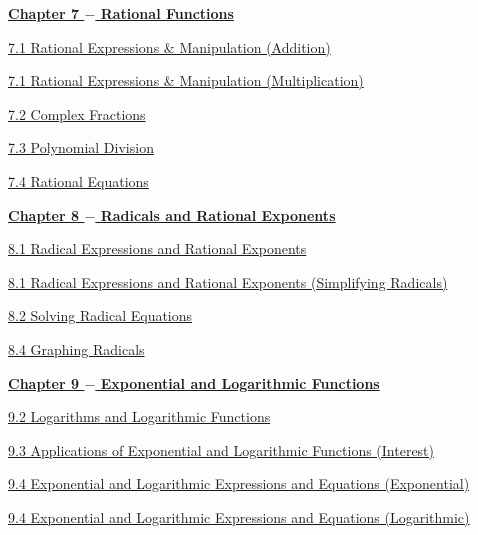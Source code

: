 \documentclass[../book.tex]{subfiles}
\begin{document}
\noindent \underline{\textbf{Chapter 7 $-$ Rational Functions}}

\href{https://cdn.kutasoftware.com/Worksheets/Alg1/Adding%20and%20Subtracting%20Rational%20Expressions.pdf}{7.1   Rational Expressions \& Manipulation (Addition)}

\href{https://cdn.kutasoftware.com/Worksheets/Alg1/Multiplying%20Rational%20Expressions.pdf}{7.1   Rational Expressions \& Manipulation (Multiplication)}

\href{https://cdn.kutasoftware.com/Worksheets/Alg2/Complex%20Fractions.pdf}{7.2   Complex Fractions}

\href{https://cdn.kutasoftware.com/Worksheets/Alg1/Dividing%20Polynomials.pdf}{7.3   Polynomial Division}

\href{https://cdn.kutasoftware.com/Worksheets/Alg1/Solving%20Rational%20Equations%202.pdf}{7.4   Rational Equations} 

\noindent \underline{\textbf{Chapter 8 $-$ Radicals and Rational Exponents}}

\href{https://cdn.kutasoftware.com/Worksheets/Alg2/Radicals%20and%20Rational%20Exponents.pdf}{8.1   Radical Expressions and Rational Exponents}

\href{https://cdn.kutasoftware.com/Worksheets/Alg2/Simplifying%20Radicals.pdf}{8.1   Radical Expressions and Rational Exponents (Simplifying Radicals)}

\href{https://cdn.kutasoftware.com/Worksheets/Alg2/Square%20Root%20Equations.pdf}{8.2   Solving Radical Equations}

\href{https://cdn.kutasoftware.com/Worksheets/Alg2/Graphing%20Radicals.pdf}{8.4   Graphing Radicals}

\noindent \underline{\textbf{Chapter 9 $-$ Exponential and Logarithmic Functions}}

\href{https://cdn.kutasoftware.com/Worksheets/Precalc/03%20-%20Properties%20of%20Logarithms.pdf}{9.2   Logarithms and Logarithmic Functions}

\href{https://cdn.kutasoftware.com/Worksheets/Precalc/03%20-%20Compound%20Interest.pdf}{9.3   Applications of Exponential and Logarithmic Functions (Interest)}

\href{https://cdn.kutasoftware.com/Worksheets/Alg2/Solving%20Exponential%20Equations%20with%20Logarithms.pdf}{9.4   Exponential and Logarithmic Expressions and Equations (Exponential)}

\href{https://cdn.kutasoftware.com/Worksheets/Alg2/Logarithmic%20Equations.pdf}{9.4   Exponential and Logarithmic Expressions and Equations (Logarithmic)}
\end{document}
